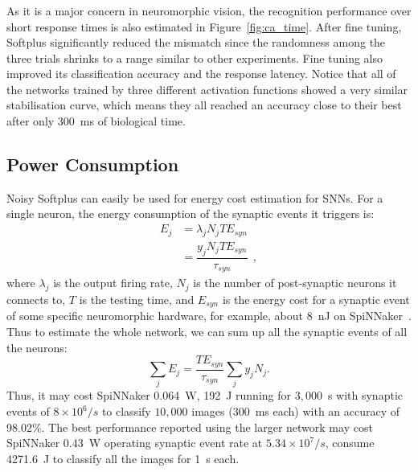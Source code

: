 	\DIFaddbegin \subsubsection{}
	\DIFaddend As it is a major concern in neuromorphic vision, the recognition performance over short response times is also estimated in Figure~\ref{fig:ca_time}.
	After fine tuning, Softplus significantly reduced the mismatch since the randomness among the three trials shrinks to a range similar to other experiments.
	Fine tuning also improved its classification accuracy and the response latency.
	Notice that all of the networks trained by three different activation functions showed a very similar stabilisation curve, which means they all reached an accuracy close to their best after only 300~ms of biological time. 

	
	\subsection{Power Consumption}
	\DIFaddbegin \label{subsec:result_power}
	\DIFaddend Noisy Softplus can easily be used for energy cost estimation for SNNs.
	For a single neuron, the energy consumption of the synaptic events it triggers is:
	\begin{equation}
	\begin{aligned}
	E_{j} &= \lambda_j N_j T E_{syn}\\
	&= \dfrac{y_j N_j T E_{syn}}{\tau_{syn}}~~,
	\end{aligned}
	\label{equ:energy}
	\end{equation}
	where $\lambda_j$ is the output firing rate, $N_j$ is the number of post-synaptic neurons it connects to, $T$ is the testing time, and $E_{syn}$ is the energy cost for a synaptic event of some specific neuromorphic hardware, for example, about 8~nJ on SpiNNaker~\citep{stromatias2013power}.
	Thus to estimate the whole network, we can sum up all the synaptic events of all the neurons:
	\begin{equation}
	\sum_j E_{j} =  \dfrac{T E_{syn}}{\tau_{syn}} \sum_{j}y_j N_j.
	\end{equation}
	Thus, it may cost SpiNNaker 0.064~W, 192~J running for $3,000$~s with synaptic events of $8\times10^6/s$ to classify $10,000$ images (300~ms each) with an accuracy of 98.02\%.
	The best performance reported using the larger network may cost SpiNNaker 0.43~W operating synaptic event rate at $5.34\times10^7/s$, consume 4271.6~J to classify all the images for 1~s each.

